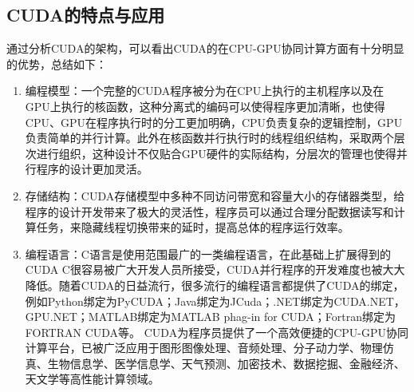 \subsection{CUDA的特点与应用}
通过分析CUDA的架构，可以看出CUDA的在CPU-GPU协同计算方面有十分明显的优势，总结如下：
\begin{enumerate}
\item	编程模型：一个完整的CUDA程序被分为在CPU上执行的主机程序以及在GPU上执行的核函数，这种分离式的编码可以使得程序更加清晰，也使得CPU、GPU在程序执行时的分工更加明确，CPU负责复杂的逻辑控制，GPU负责简单的并行计算。此外在核函数并行执行时的线程组织结构，采取两个层次进行组织，这种设计不仅贴合GPU硬件的实际结构，分层次的管理也使得并行程序的设计更加灵活。
\item	存储结构：CUDA存储模型中多种不同访问带宽和容量大小的存储器类型，给程序的设计开发带来了极大的灵活性，程序员可以通过合理分配数据读写和计算任务，来隐藏线程切换带来的延时，提高总体的程序运行效率。
\item	编程语言：C语言是使用范围最广的一类编程语言，在此基础上扩展得到的CUDA C很容易被广大开发人员所接受，CUDA并行程序的开发难度也被大大降低。随着CUDA的日益流行，很多流行的编程语言都提供了CUDA的绑定，例如Python绑定为PyCUDA；Java绑定为JCuda；.NET绑定为CUDA.NET，GPU.NET；MATLAB绑定为MATLAB phag-in for CUDA；Fortran绑定为FORTRAN CUDA等。
CUDA为程序员提供了一个高效便捷的CPU-GPU协同计算平台，已被广泛应用于图形图像处理、音频处理、分子动力学、物理仿真、生物信息学、医学信息学、天气预测、加密技术、数据挖掘、金融经济、天文学等高性能计算领域。
\end{enumerate}



